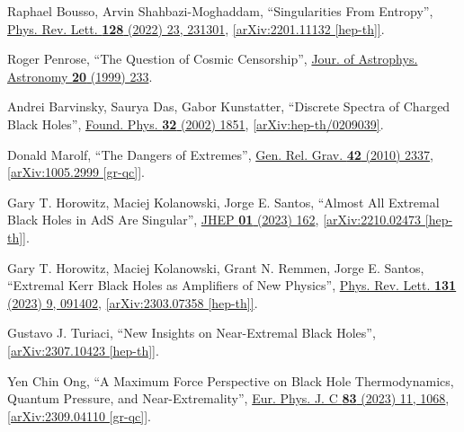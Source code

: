 \documentclass[preprintnumbers, floatfix, preprintnumbers, letterpaper, twocolumn, superscriptaddress,nofootinbib]{revtex4-2}
\begin{document}
\begin{thebibliography}{99}
Raphael Bousso, Arvin Shahbazi-Moghaddam, ``Singularities From Entropy'', {\hypersetup{urlcolor=vividviolet}\href{Phys.Rev.Lett. 128 (2022) 23, 231301}{Phys. Rev. Lett. \textbf{128} (2022) 23, 231301}}, \href{https://arxiv.org/abs/2201.11132}{[arXiv:2201.11132 [hep-th]]}.

Roger Penrose, ``The Question of Cosmic Censorship'',
{\hypersetup{urlcolor=vividviolet}\href{https://adsabs.harvard.edu/full/1999JApA...20..233P}{Jour. of Astrophys. Astronomy \textbf{20} (1999) 233}}.

Andrei Barvinsky, Saurya Das, Gabor Kunstatter, ``Discrete Spectra of Charged Black Holes'', {\hypersetup{urlcolor=vividviolet}\href{https://link.springer.com/article/10.1023/A:1022314632647}{Found. Phys. \textbf{32} (2002) 1851}}, \href{https://arxiv.org/abs/hep-th/0209039}{[arXiv:hep-th/0209039]}.

Donald Marolf, ``The Dangers of Extremes'', {\hypersetup{urlcolor=vividviolet}\href{https://link.springer.com/article/10.1007/s10714-010-1027-z}{Gen. Rel. Grav. \textbf{42} (2010) 2337}}, \href{https://arxiv.org/abs/1005.2999}{[arXiv:1005.2999 [gr-qc]]}.

Gary T. Horowitz, Maciej Kolanowski, Jorge E. Santos, ``Almost All Extremal Black Holes in AdS Are Singular'', {\hypersetup{urlcolor=vividviolet}\href{https://link.springer.com/article/10.1007/JHEP01(2023)162}{JHEP \textbf{01} (2023) 162}}, \href{https://arxiv.org/abs/2210.02473}{[arXiv:2210.02473 [hep-th]]}. 

Gary T. Horowitz, Maciej Kolanowski, Grant N. Remmen, Jorge E. Santos, ``Extremal Kerr Black Holes as Amplifiers of New Physics'', {\hypersetup{urlcolor=vividviolet}\href{https://journals.aps.org/prl/abstract/10.1103/PhysRevLett.131.091402}{Phys. Rev. Lett. \textbf{131} (2023) 9, 091402}}, \href{https://arxiv.org/abs/2303.07358}{[arXiv:2303.07358 [hep-th]]}.

Gustavo J. Turiaci, ``New Insights on Near-Extremal Black Holes'', \href{https://arxiv.org/abs/2307.10423}{[arXiv:2307.10423 [hep-th]]}.

Yen Chin Ong, ``A Maximum Force Perspective on Black Hole Thermodynamics, Quantum Pressure, and Near-Extremality'', {\hypersetup{urlcolor=vividviolet}\href{https://link.springer.com/article/10.1140/epjc/s10052-023-12253-9}{Eur. Phys. J. C \textbf{83} (2023) 11, 1068}}, \href{https://arxiv.org/abs/2309.04110}{[arXiv:2309.04110 [gr-qc]]}.


\end{thebibliography}
\end{document}
